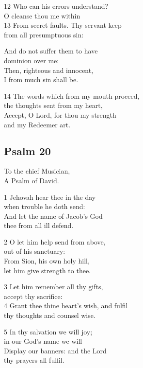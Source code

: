 12 Who can his errors understand?\\
O cleanse thou me within\\
13 From secret faults. Thy servant keep\\
from all presumptuous sin:

And do not suffer them to have\\
dominion over me:\\
Then, righteous and innocent,\\
I from much sin shall be.

14 The words which from my mouth proceed,\\
the thoughts sent from my heart,\\
Accept, O Lord, for thou my strength\\
and my Redeemer art.

\begin{center}
\quad{}\quad{}
\end{center}

\subsection*{Psalm 20 }

To the chief Musician,\\
A Psalm of David.

1 Jehovah hear thee in the day\\
when trouble he doth send:\\
And let the name of Jacob’s God\\
thee from all ill defend.

2 O let him help send from above,\\
out of his sanctuary:\\
From Sion, his own holy hill,\\
let him give strength to thee.

3 Let him remember all thy gifts,\\
accept thy sacrifice:\\
4 Grant thee thine heart’s wish, and fulfil\\
thy thoughts and counsel wise.

5 In thy salvation we will joy;\\
in our God’s name we will\\
Display our banners: and the Lord\\
thy prayers all fulfil.

